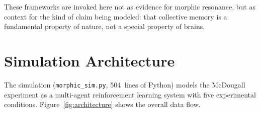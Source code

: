 \documentclass[twoside,11pt]{article}
\begin{document}
These frameworks are invoked here not as evidence for morphic resonance, but
as context for the kind of claim being modeled: that collective memory is a
fundamental property of nature, not a special property of brains.


\section{Simulation Architecture}
\label{sec:architecture}

The simulation (\texttt{morphic\_sim.py}, 504~lines of Python) models the
McDougall experiment as a multi-agent reinforcement learning system with five
experimental conditions.  Figure~\ref{fig:architecture} shows the overall
data flow.
\end{document}
